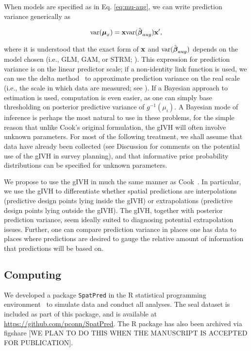 \documentclass[10pt,letterpaper]{article}
\begin{document}
When models are specified as in Eq. \ref{eq:mu-aug}, we can write prediction variance generically as
\begin{linenomath*}
\begin{equation}
  \label{eq:var-mu}
  {\rm var}(\boldsymbol{\mu}_x)= {\bf x} {\rm var}(\hat{\boldsymbol{\beta}}_{aug}) {\bf x}^\prime,
\end{equation}
\end{linenomath*}
where it is understood that the exact form of ${\bf x}$ and ${\rm var}(\hat{\boldsymbol{\beta}}_{aug})$ depends on the model chosen (i.e., GLM, GAM, or STRM; ). This expression for prediction variance is on the linear predictor scale; if a non-identity link function is used, we can use the delta method~\cite{Dorfman1938,VerHoef2012b} to approximate prediction variance on the real scale (i.e., the scale in which data are measured; see ).  If a Bayesian approach to estimation is used, computation is even easier, as one can simply base thresholding on posterior predictive variance of $g^{-1}(\mu_i)$.  A Bayesian mode of inference is perhaps the most natural to use in these problems, for the simple reason that unlike Cook's original formulation, the gIVH will often involve unknown parameters.  For most of the following treatment, we shall assume that data have already been collected (see Discussion for comments on the potential use of the gIVH in survey planning), and that informative prior probability distributions can be specified for unknown parameters.

We propose to use the gIVH in much the same manner as Cook~\cite{1979}.  In particular, we use the gIVH to differentiate whether spatial predictions are interpolations (predictive design points lying inside the gIVH) or extrapolations (predictive design points lying outside the gIVH).  The gIVH, together with posterior prediction variance, seem ideally suited to diagnosing potential extrapolation issues. Further, one can compare prediction variance in places one has data to places where predictions are desired to gauge the relative amount of information that predictions will be based on.

\subsection*{Computing}

We developed a package \texttt{SpatPred} in the R statistical programming environment~\cite{RTeam2012} to simulate data and conduct all analyses.  The seal dataset is included as part of this package, and is available at \url{https://github.com/pconn/SpatPred}.  The R package has also been archived via figshare [WE PLAN TO DO THIS WHEN THE MANUSCRIPT IS ACCEPTED FOR PUBLICATION].
\end{document}

